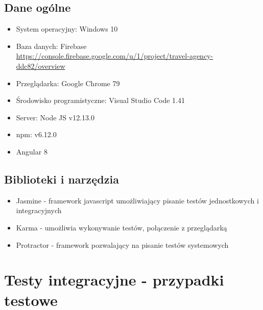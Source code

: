 \documentclass[a4paper,15pt]{article}
\begin{document}
\subsection{Dane ogólne}
\begin{itemize}
\item System operacyjny: Windows 10
\item Baza danych: Firebase \url{https://console.firebase.google.com/u/1/project/travel-agency-ddc82/overview}
\item Przeglądarka: Google Chrome 79
\item Środowisko programistyczne: Visual Studio Code 1.41
\item Server: Node JS v12.13.0
\item npm: v6.12.0
\item Angular 8
\end{itemize}

\subsection{Biblioteki i narzędzia}
\begin{itemize}
\item Jasmine - framework javascript umożliwiający pisanie testów jednostkowych i integracyjnych
\item Karma - umożliwia wykonywanie testów, połączenie z przeglądarką
\item Protractor - framework pozwalający na pisanie testów systemowych
\end{itemize}

\newpage
\section{Testy integracyjne - przypadki testowe}
\end{document}
